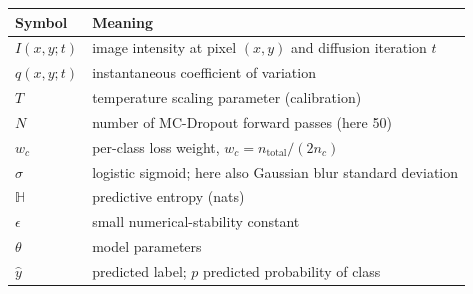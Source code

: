 \begin{tabularx}{\linewidth}{@{}lX@{}}
\toprule
\textbf{Symbol} & \textbf{Meaning} \\
\midrule
$I(x,y;t)$         & image intensity at pixel $(x,y)$ and diffusion iteration $t$ \\
$q(x,y;t)$         & instantaneous coefficient of variation \\
$T$                & temperature scaling parameter (calibration) \\
$N$                & number of MC-Dropout forward passes (here 50) \\
$w_c$              & per-class loss weight, $w_c = n_{\text{total}}/(2 n_c)$ \\
$\sigma$           & logistic sigmoid; here also Gaussian blur standard deviation \\
$\mathbb{H}$       & predictive entropy (nats) \\
$\epsilon$         & small numerical-stability constant \\
$\theta$           & model parameters \\
$\hat{y}$          & predicted label; $p$ predicted probability of \PCOS{} class \\
\bottomrule
\end{tabularx}